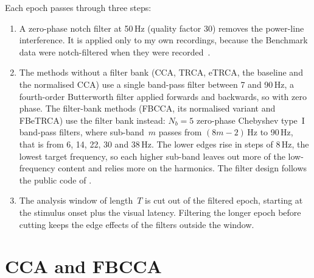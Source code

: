 Each epoch passes through three steps:
\begin{enumerate}
    \item A zero-phase notch filter at 50\,Hz (quality factor 30) removes the power-line
          interference. It is applied only to my own recordings, because the Benchmark data
          were notch-filtered when they were recorded~\citep{wang2017benchmark}.
    \item The methods without a filter bank (\ac{CCA}, \ac{TRCA}, \ac{eTRCA}, the baseline
          and the normalised \ac{CCA}) use a single band-pass filter between 7 and 90\,Hz, a
          fourth-order Butterworth filter applied forwards and backwards, so with zero phase.
          The filter-bank methods (\ac{FBCCA}, its normalised variant and \ac{FBeTRCA}) use
          the filter bank instead: $N_b = 5$ zero-phase Chebyshev type~I band-pass filters,
          where sub-band~$m$ passes from $(8m - 2)$\,Hz to 90\,Hz, that is from 6, 14, 22, 30
          and 38\,Hz. The lower edges rise in steps of 8\,Hz, the lowest target frequency, so
          each higher sub-band leaves out more of the low-frequency content and relies more on
          the harmonics. The filter design follows the public code of
          \citet{nakanishi2018trca}.
    \item The analysis window of length~$T$ is cut out of the filtered epoch, starting at the
          stimulus onset plus the visual latency. Filtering the longer epoch before cutting
          keeps the edge effects of the filters outside the window.
\end{enumerate}

\section{CCA and FBCCA}
\label{sec:cca}

